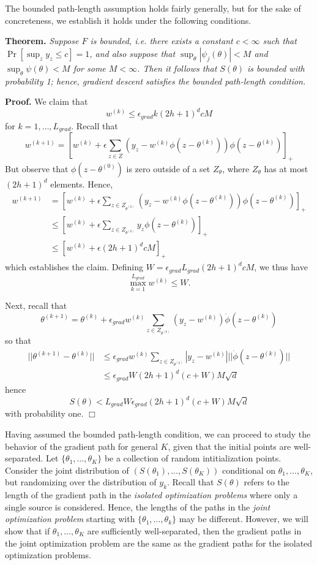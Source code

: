 \documentclass[11pt]{article}
\begin{document}
The bounded path-length assumption holds fairly generally, but for the sake of concreteness,
we establish it holds under the following conditions.


\textbf{Theorem. }\emph{
Suppose $F$ is bounded, i.e. there exists a constant $c < \infty$ such that $\Pr[\sup_z y_z \leq c] = 1$,
and also suppose that $\sup_\theta |\psi_j(\theta)| < M$ and $\sup_\theta \psi(\theta) < M$ for some $M < \infty$.
Then it follows that
$S(\theta)$ is bounded with probability 1;  hence, gradient
descent satisfies the bounded path-length condition.  }



\textbf{Proof.}
We claim that
\[
w^{(k)} \leq \epsilon_{grad} k (2h+1)^d cM
\]
for $k = 1,\hdots, L_{grad}$.
Recall that
\[
w^{(k+1)} = \left[w^{(k)} + \epsilon \sum_{z \in Z} (y_z - w^{(k)} \phi(z - \theta^{(k)})) \phi(z - \theta^{(k)})\right]_+
\]
But observe that $\phi(z - \theta^{(0)})$ is zero outside of a set $Z_{\theta}$, where $Z_\theta$ has at most $(2h + 1)^d$ elements.
Hence,
\begin{align*}
w^{(k+1)} &= \left[w^{(k)} + \epsilon \sum_{z \in Z_{\theta^{(k)}}} (y_z - w^{(k)} \phi(z - \theta^{(k)})) \phi(z - \theta^{(k)})\right]_+
\\&\leq \left[w^{(k)} + \epsilon \sum_{z \in Z_{\theta^{(k)}}} y_z \phi(z - \theta^{(k)})\right]_+
\\&\leq \left[w^{(k)} + \epsilon (2h+1)^d c M\right]_+
\end{align*}
which establishes the claim.
Defining $W = \epsilon_{grad} L_{grad} (2h+1)^d c M$, we thus have
\[
\max_{k=1}^{L_{grad}} w^{(k)} \leq W.
\]

Next, recall that
\[
\theta^{(k+1)} = \theta^{(k)} + \epsilon_{grad} w^{(k)} \sum_{z \in Z_{\theta^{(k)}}} (y_z - w^{(k)}) \dot{\phi}(z - \theta^{(k)})
\]
so that
\begin{align*}
||\theta^{(k+1)} - \theta^{(k)}|| &\leq \epsilon_{grad} w^{(k)} \sum_{z \in Z_{\theta^{(k)}}} |y_z - w^{(k)}| ||\dot{\phi}(z - \theta^{(k)})||
\\&\leq \epsilon_{grad} W (2h+1)^d (c + W) M\sqrt{d}
\end{align*}
hence
\[
S(\theta) < L_{grad} W \epsilon_{grad} (2h+1)^d (c + W) M\sqrt{d}
\]
with probability one. $\Box$


Having assumed the bounded path-length condition, we can proceed to
study the behavior of the gradient path for general $K$, given that
the initial points are well-separated.  Let $\{\theta_1, \hdots,
\theta_K\}$ be a collection of random intitialization points.
Consider the joint distribution of $(S(\theta_1),\hdots, S(\theta_K))$
conditional on $\theta_1,\hdots, \theta_K$, but randomizing over the
distribution of $y_k$.  Recall that $S(\theta)$ refers to the length
of the gradient path in the \emph{isolated optimization problems}
where only a single source is considered.  Hence, the lengths of the
paths in the \emph{joint optimization problem} starting with
$\{\theta_1,\hdots, \theta_k\}$ may be different.  However, we will
show that if $\theta_1,\hdots, \theta_K$ are sufficiently
well-separated, then the gradient paths in the joint optimization
problem are the same as the gradient paths for the isolated
optimization problems.
\end{document}
